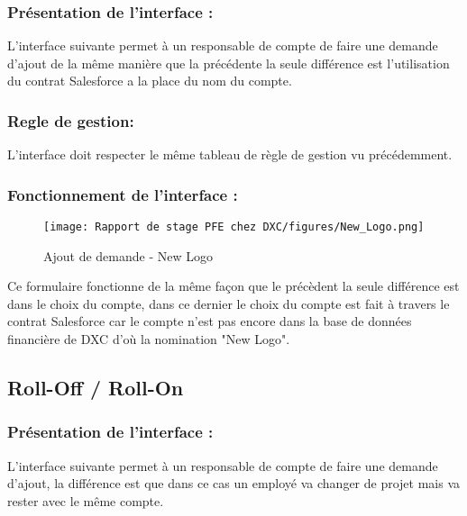 \subsubsection{Présentation de l'interface :}

L'interface suivante permet à un responsable de compte de faire une demande d'ajout de la même manière que la précédente la seule différence est l'utilisation du contrat Salesforce a la place du nom du compte.

\subsubsection{Regle de gestion:}

L'interface doit respecter le même tableau de règle de gestion vu précédemment.

\subsubsection{Fonctionnement de l'interface :}

\begin{figure}[H]
    \centering
    \texttt{[image: Rapport de stage PFE chez DXC/figures/New\_Logo.png]}
    \caption{Ajout de demande - New Logo}
\end{figure}

Ce formulaire fonctionne de la même façon que le précèdent la seule différence est dans le choix du compte, dans ce dernier le choix du compte est fait à travers le contrat Salesforce car le compte n'est pas encore dans la base de données financière de DXC d'où la nomination "New Logo".

\newpage


\subsection{Roll-Off / Roll-On}

\subsubsection{Présentation de l'interface :}

L’interface suivante permet à un responsable de compte de faire une demande d’ajout, la différence est que dans ce cas un employé va changer de projet mais va rester avec le même compte.

